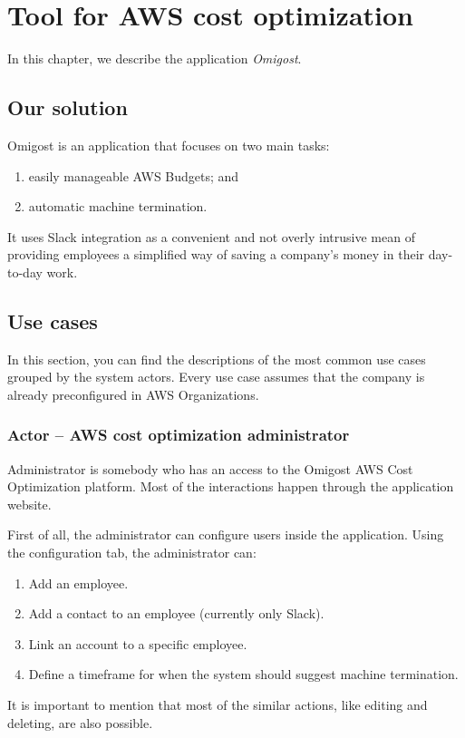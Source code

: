 \documentclass[licencjacka,en]{thesisclass}
\begin{document}
    \chapter{Tool for AWS cost optimization}

    In this chapter, we describe the application \textit{Omigost}.

    \section{Our solution}

    Omigost is an application that focuses on two main tasks:
    \begin{enumerate}
        \item easily manageable AWS Budgets; and
        \item automatic machine termination.
    \end{enumerate}

    It uses Slack integration as a convenient and not overly intrusive mean
    of providing employees a simplified way of saving a company's money in their day-to-day work.

    \section{Use cases}

    In this section, you can find the descriptions of the most common use cases
    grouped by the system actors.
    Every use case assumes that the company is already
    preconfigured in AWS Organizations.

    \subsection{Actor -- AWS cost optimization administrator}

    Administrator is somebody who has an access to the Omigost AWS Cost Optimization platform.
    Most of the interactions happen through the application website.

    First of all, the administrator can configure users inside the application.
    Using the configuration tab, the administrator can:

    \begin{enumerate}
        \item Add an employee.
        \item Add a contact to an employee (currently only Slack).
        \item Link an account to a specific employee.
        \item Define a timeframe for when the system should suggest machine termination.
    \end{enumerate}
    It is important to mention that most of the similar
    actions, like editing and deleting, are also possible.
\end{document}
